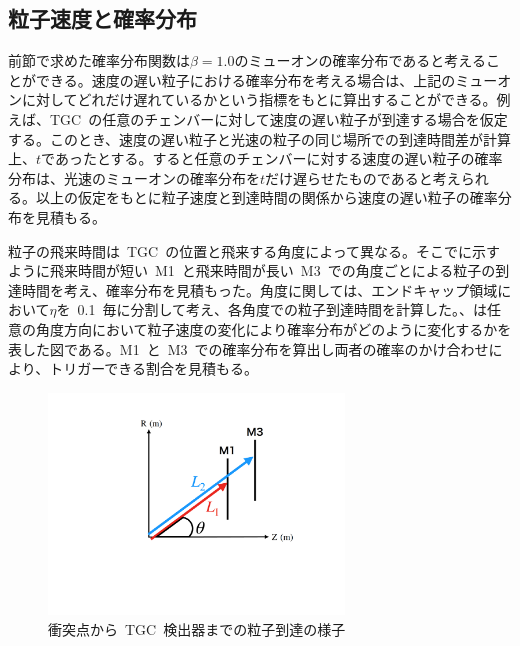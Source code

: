 \subsection{粒子速度と確率分布}\label{sec:prob}
前節で求めた確率分布関数は$\beta=1.0$のミューオンの確率分布であると考えることができる。速度の遅い粒子における確率分布を考える場合は、上記のミューオンに対してどれだけ遅れているかという指標をもとに算出することができる。例えば、TGC~の任意のチェンバーに対して速度の遅い粒子が到達する場合を仮定する。このとき、速度の遅い粒子と光速の粒子の同じ場所での到達時間差が計算上、$t$であったとする。すると任意のチェンバーに対する速度の遅い粒子の確率分布は、光速のミューオンの確率分布を$t$だけ遅らせたものであると考えられる。以上の仮定をもとに粒子速度と到達時間の関係から速度の遅い粒子の確率分布を見積もる。

粒子の飛来時間は~TGC~の位置と飛来する角度によって異なる。そこでに示すように飛来時間が短い~M1~と飛来時間が長い~M3~での角度ごとによる粒子の到達時間を考え、確率分布を見積もった。角度に関しては、エンドキャップ領域において$\eta$を~0.1~毎に分割して考え、各角度での粒子到達時間を計算した。、は任意の角度方向において粒子速度の変化により確率分布がどのように変化するかを表した図である。M1~と~M3~での確率分布を算出し両者の確率のかけ合わせにより、トリガーできる割合を見積もる。
\begin{figure}[tbp]
    \centering   
    \includegraphics[width=0.7\textwidth,page=1]{img/slide/BX.pdf}
    \caption{衝突点から~TGC~検出器までの粒子到達の様子}\label{fig:velo}
\end{figure}

